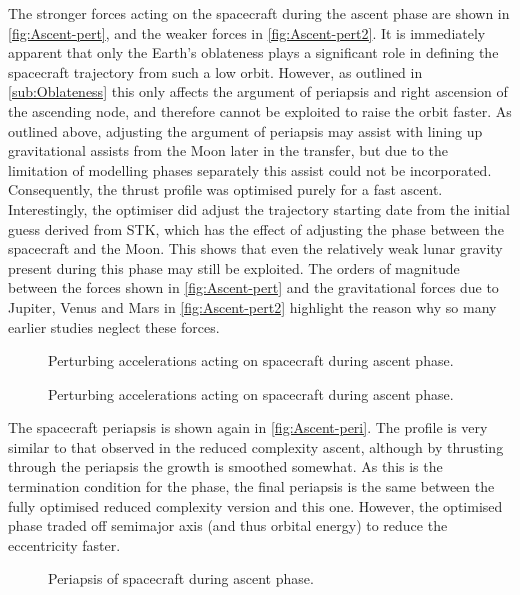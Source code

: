 The stronger forces acting on the spacecraft during the ascent phase are shown in \autoref{fig:Ascent-pert}, and the weaker forces in \autoref{fig:Ascent-pert2}. It is immediately apparent that only the Earth's oblateness plays a significant role in defining the spacecraft trajectory from such a low orbit. However, as outlined in \autoref{sub:Oblateness} this only affects the argument of periapsis and right ascension of the ascending node, and therefore cannot be exploited to raise the orbit faster. As outlined above, adjusting the argument of periapsis may assist with lining up gravitational assists from the Moon later in the transfer, but due to the limitation of modelling phases separately this assist could not be incorporated. Consequently, the thrust profile was optimised purely for a fast ascent. Interestingly, the optimiser did adjust the trajectory starting date from the initial guess derived from STK, which has the effect of adjusting the phase between the spacecraft and the Moon. This shows that even the relatively weak lunar gravity present during this phase may still be exploited. The orders of magnitude between the forces shown in \autoref{fig:Ascent-pert} and the gravitational forces due to Jupiter, Venus and Mars in \autoref{fig:Ascent-pert2} highlight the reason why so many earlier studies neglect these forces. 

\begin{figure}
\caption{Perturbing accelerations acting on spacecraft during ascent phase.} \label{fig:Ascent-pert}
\centering
\def\svgwidth{\figurewidth}

\end{figure}

\begin{figure}
\caption{Perturbing accelerations acting on spacecraft during ascent phase.} \label{fig:Ascent-pert2}
\centering
\def\svgwidth{\figurewidth}

\end{figure}

The spacecraft periapsis is shown again in \autoref{fig:Ascent-peri}. The profile is very similar to that observed in the reduced complexity ascent, although by thrusting through the periapsis the growth is smoothed somewhat. As this is the termination condition for the phase, the final periapsis is the same between the fully optimised reduced complexity version and this one. However, the optimised phase traded off semimajor axis (and thus orbital energy) to reduce the eccentricity faster. 

\begin{figure}
\caption{Periapsis of spacecraft during ascent phase.} \label{fig:Ascent-peri}
\centering
\def\svgwidth{\figurewidth}

\end{figure}

